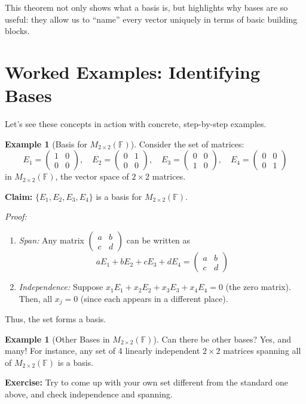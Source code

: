 \documentclass[11pt]{article}
\theoremstyle{definition}
\newtheorem{example}[definition]{Example}
\theoremstyle{plain}
\begin{document}
This theorem not only shows what a basis is, but highlights why bases are so useful: they allow us to ``name'' every vector uniquely in terms of basic building blocks.

\section{Worked Examples: Identifying Bases}

Let’s see these concepts in action with concrete, step-by-step examples.

\begin{example}[Basis for $M_{2\times 2}(\mathbb{F})$]
Consider the set of matrices:
\[
E_1 = \begin{pmatrix}1 & 0 \\ 0 & 0\end{pmatrix}, \quad
E_2 = \begin{pmatrix}0 & 1 \\ 0 & 0\end{pmatrix}, \quad
E_3 = \begin{pmatrix}0 & 0 \\ 1 & 0\end{pmatrix}, \quad
E_4 = \begin{pmatrix}0 & 0 \\ 0 & 1\end{pmatrix}
\]
in $M_{2\times 2}(\mathbb{F})$, the vector space of $2\times 2$ matrices.

\textbf{Claim:} $\{E_1, E_2, E_3, E_4\}$ is a basis for $M_{2\times 2}(\mathbb{F})$.

\textit{Proof:}
\begin{enumerate}
  \item \emph{Span:} Any matrix 
  $
  \begin{pmatrix}
  a & b \\ c & d
  \end{pmatrix}
  $ can be written as
  \[
  aE_1 + bE_2 + cE_3 + dE_4 = \begin{pmatrix}a & b \\ c & d\end{pmatrix}
  \]
  \item \emph{Independence:} Suppose $x_1E_1 + x_2E_2 + x_3E_3 + x_4E_4 = 0$ (the zero matrix). Then, all $x_j = 0$ (since each appears in a different place).
\end{enumerate}
Thus, the set forms a basis.
\end{example}

\begin{example}[Other Bases in $M_{2\times 2}(\mathbb{F})$]
Can there be other bases? Yes, and many! For instance, any set of 4 linearly independent $2 \times 2$ matrices spanning all of $M_{2\times 2}(\mathbb{F})$ is a basis.

\textbf{Exercise:} Try to come up with your own set different from the standard one above, and check independence and spanning.
\end{example}
\end{document}
